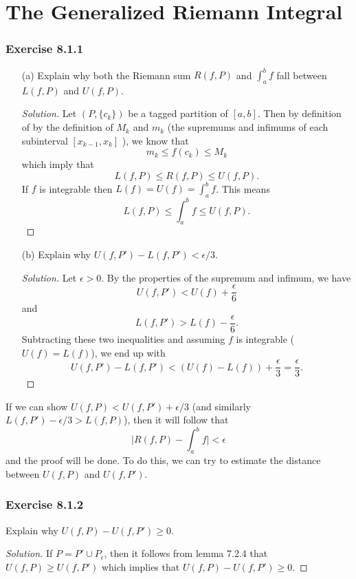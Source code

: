\section{The Generalized Riemann Integral}
\subsubsection{Exercise 8.1.1} 
\begin{enumerate}
    \item[(a)] Explain why both the Riemann sum \( R(f,P)  \) and \( \int_{ a }^{ b } f  \) fall between \( L(f,P)  \) and \( U(f,P)  \). 
        \begin{proof}[Solution]
            Let \( (P, \{ c_{k }  \} ) \) be a tagged partition of \( [a,b]  \). Then by definition of by the definition of \( M_{k }  \)  and \( m_{k }   \) (the supremums and infimums  of each subinterval \( [x_{k-1} , x_{k }] \) ), we know that 
            \[  m_{ k } \leq f(c_{ k }  )  \leq M_{k } \] which imply that 
            \[ L(f,P) \leq R(f,P) \leq U(f,P). \]
            If \( f  \) is integrable then \( L(f) = U(f) = \int_{ a }^{ b } f   \). This means 
            \[ L(f,P) \leq \int_{ a }^{ b } f \leq U(f,P).\]
        \end{proof}
        \item[(b)] Explain why \( U(f,P') - L(f, P') < \epsilon / 3.  \)
            \begin{proof}[Solution]
           Let \( \epsilon > 0  \). By the properties of the supremum and infimum, we have 
            \[ U(f,P') < U(f) + \frac{ \epsilon  }{ 6 } \] and 
            \[  L(f,P') > L(f) - \frac{ \epsilon  }{ 6 }. \] Subtracting these two inequalities and assuming \( f  \) is integrable (\( U(f) = L(f) \)), we end up with 
            \[  U(f,P') - L(f,P') < (U(f) - L(f)) + \frac{ \epsilon  }{ 3 } = \frac{ \epsilon  }{ 3 }. \]
            \end{proof}
\end{enumerate}

If we can show \( U(f,P) < U(f,P') + \epsilon / 3   \) (and similarly \( L(f,P') - \epsilon / 3 > L(f,P)  \)), then it will follow that 
\[  \Big| R(f,P) - \int_{ a }^{ b } f  \Big| < \epsilon \]
and the proof will be done. To do this, we can try to estimate the distance between \( U(f,P)  \) and \( U(f, P')  \).
\subsubsection{Exercise 8.1.2} Explain why \( U(f,P) - U(f,P') \geq 0  \).
\begin{proof}[Solution]
If \( P = P' \cup P_{\epsilon }  \), then it follows from lemma 7.2.4 that \( U(f,P) \geq U(f,P')   \) which implies that \( U(f,P) - U(f,P') \geq 0  \). 
\end{proof}


